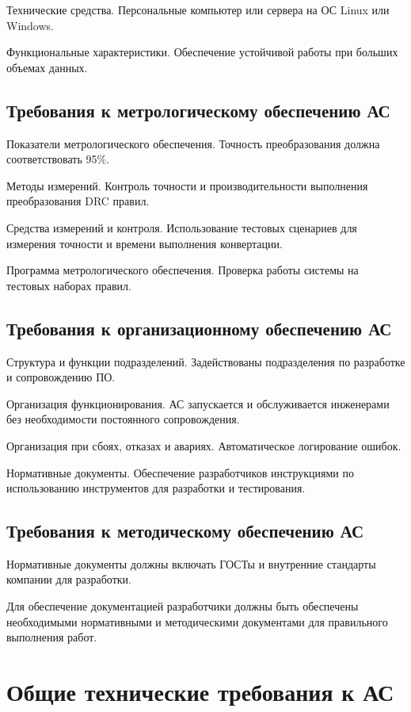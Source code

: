 Технические средства.
Персональные компьютер или сервера на ОС Linux или Windows.

Функциональные характеристики.
Обеспечение устойчивой работы при больших объемах данных.

\subsection{Требования к метрологическому обеспечению АС}

Показатели метрологического обеспечения.
Точность преобразования должна соответствовать 95\%.

Методы измерений.
Контроль точности и производительности выполнения преобразования DRC правил.

Средства измерений и контроля.
Использование тестовых сценариев для измерения точности
и времени выполнения конвертации.

Программа метрологического обеспечения.
Проверка работы системы на тестовых наборах правил.

\subsection{Требования к организационному обеспечению АС}

Структура и функции подразделений.
Задействованы подразделения по разработке и сопровождению ПО.

Организация функционирования.
АС запускается и обслуживается инженерами
без необходимости постоянного сопровождения.

Организация при сбоях, отказах и авариях.
Автоматическое логирование ошибок.

Нормативные документы.
Обеспечение разработчиков инструкциями по использованию инструментов
для разработки и тестирования.

\subsection{Требования к методическому обеспечению АС}

Нормативные документы должны включать
ГОСТы и внутренние стандарты компании для разработки.

Для обеспечение документацией разработчики
должны быть обеспечены необходимыми нормативными
и методическими документами для правильного выполнения работ.

\section{Общие технические требования к АС}

